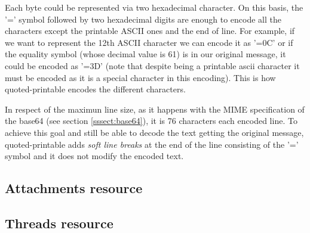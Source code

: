 Each byte could be represented via two hexadecimal character. On this basis, the '=' symbol followed by two hexadecimal digits are enough to encode all the characters except the printable ASCII ones and the end of line. For example, if we want to represent the 12th ASCII character we can encode it as '=0C' or if the equality symbol (whose decimal value is 61) is in our original message, it could be encoded as '=3D' (note that despite being a printable ascii character it must be encoded as it is a special character in this encoding). This is how quoted-printable encodes the different characters.

In respect of the maximun line size, as it happens with the MIME specification of the base64 (see section \ref{sssect:base64}), it is 76 characters each encoded line. To achieve this goal and still be able to decode the text getting the original message, quoted-printable adds \textit{soft line breaks} at the end of the line consisting of the '=' symbol and it does not modify the encoded text.

\subsection{Attachments resource} \label{ssect:attres}

\subsection{Threads resource}\label{ssect:threads}

